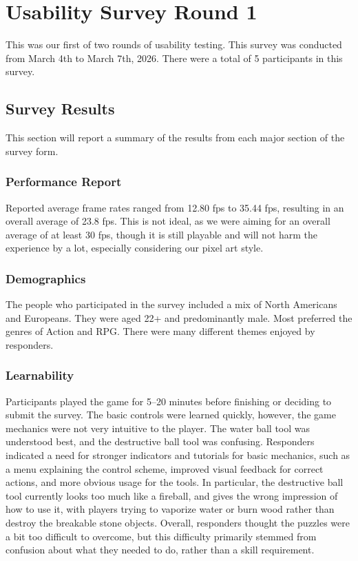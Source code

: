 \documentclass[12pt, titlepage]{article}
\begin{document}
\section{Usability Survey Round 1}
This was our first of two rounds of usability testing.
This survey was conducted from March 4th to March 7th, 2026.
There were a total of 5 participants in this survey.

\subsection{Survey Results}
This section will report a summary of the results from each major section
of the survey form.

\subsubsection{Performance Report}
Reported average frame rates ranged from 12.80 fps to 35.44 fps,
resulting in an overall average of 23.8 fps. This is not ideal,
as we were aiming for an overall average of at least 30 fps,
though it is still playable and will not harm the experience by
a lot, especially considering our pixel art style.

\subsubsection{Demographics}
The people who participated in the survey included a mix of North
Americans and Europeans. They were aged 22+ and predominantly male.
Most preferred the genres of Action and RPG. There were many different
themes enjoyed by responders.

\subsubsection{Learnability}
Participants played the game for 5--20 minutes before finishing or
deciding to submit the survey. The basic controls were learned quickly,
however, the game mechanics were not very intuitive to the player.
The water ball tool was understood best, and the destructive ball tool
was confusing. Responders indicated a need for stronger indicators and
tutorials for basic mechanics, such as a menu explaining the control
scheme, improved visual feedback for correct actions, and more
obvious usage for the tools. In particular, the destructive ball tool
currently looks too much like a fireball, and gives the wrong impression
of how to use it, with players trying to vaporize water or burn wood
rather than destroy the breakable stone objects. Overall, responders
thought the puzzles were a bit too difficult to overcome, but this 
difficulty primarily stemmed from confusion about what they needed 
to do, rather than a skill requirement.
\end{document}

